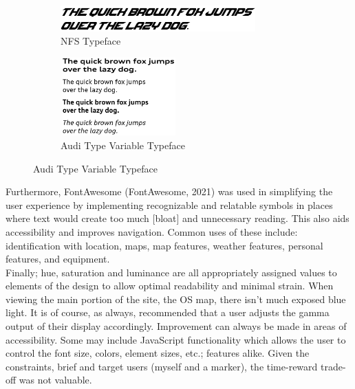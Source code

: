 \documentclass[11pt, english]{article}
\begin{document}
	\begin{figure}[H]
	\begin{center}
		\begin{subfigure}[t]{8cm}
                \begin{center}
                        \includegraphics[width=7.5cm,height=1cm]{../System/Photos/nfs.png}
                \end{center}
                        \caption{NFS Typeface}
                \end{subfigure}
                \begin{subfigure}[t]{5cm}
                \begin{center}
                        \includegraphics[width=4.5cm,height=3cm]{../System/Photos/audi.png}
                \end{center}
                        \caption{Audi Type Variable Typeface}
                \end{subfigure}
	\end{center}
	\end{figure}

	Furthermore, FontAwesome (FontAwesome, 2021) was used in simplifying the user experience by implementing recognizable and relatable symbols in places where text would create too much [bloat] and unnecessary reading. This also aids accessibility and improves navigation. Common uses of these include: identification with location, maps, map features, weather features, personal features, and equipment.\\ 

	Finally; hue, saturation and luminance are all appropriately assigned values to elements of the design to allow optimal readability and minimal strain. When viewing the main portion of the site, the OS map, there isn't much exposed blue light. It is of course, as always, recommended that a user adjusts the gamma output of their display accordingly. Improvement can always be made in areas of accessibility. Some may include JavaScript functionality which allows the user to control the font size, colors, element sizes, etc.; features alike. Given the constraints, brief and target users (myself and a marker), the time-reward trade-off was not valuable.
\end{document}
